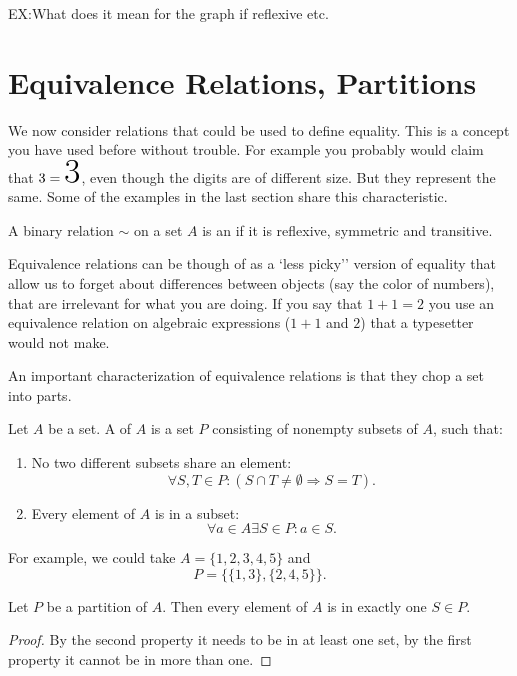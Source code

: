 EX:What does it mean for the graph if reflexive etc.

\section{Equivalence Relations, Partitions}

We now consider relations that could be used to define equality. This is a
concept you have used before without trouble. For example you probably would
claim that $3=\mbox{\Huge 3}$, even though the digits are of different
size. But they represent the same. Some of the examples in the
last section share this characteristic.
\begin{defn}
A binary relation $\sim$ on a set $A$ is an  if
it is reflexive, symmetric and transitive.
\end{defn}
Equivalence relations can be though of as a `less picky'' version of
equality that allow us to forget about differences between objects (say the
color of numbers), that are irrelevant for what you are doing. If you say
that $1+1=2$ you use an equivalence relation on algebraic expressions ($1+1$
and $2$) that a typesetter would not make.

An important characterization of equivalence relations is that they chop a
set into parts.
\begin{defn}
Let $A$ be a set. A  of $A$ is a set $P$ consisting of nonempty
subsets of $A$, such that:
\begin{enumerate}
\item No two different subsets share an element:
\[
\forall S,T\in P: (S\cap T\not=\emptyset\Rightarrow S=T).
\]
\item Every element of $A$ is in a subset: 
\[
\forall a\in A\exists S\in P: a\in S.
\]
\end{enumerate}
\end{defn}
For example, we could take $A=\{1,2,3,4,5\}$ and 
\[
P=\{\{1,3\},\{2,4,5\}\}.
\]
\begin{lemma}
Let $P$ be a partition of $A$. Then every element of $A$ is in exactly one $S\in P$.
\end{lemma}
\begin{proof}
By the second property it needs to be in at least one set, by the first property it
cannot be in more than one.
\end{proof}

